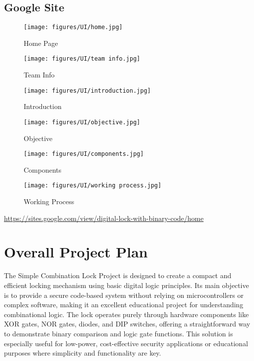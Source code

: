 \subsection{Google Site}
\begin{figure}[H]
    \centering
    \texttt{[image: figures/UI/home.jpg]} %
    \caption{Home Page}
    \label{fig:sample}
\end{figure}
\begin{figure}[H]
    \centering
    \texttt{[image: figures/UI/team info.jpg]} %
    \caption{Team Info}
    \label{fig:sample}
\end{figure}
\begin{figure}[H]
    \centering
    \texttt{[image: figures/UI/introduction.jpg]} %
    \caption{Introduction}
    \label{fig:sample}
\end{figure}
\begin{figure}[H]
    \centering
    \texttt{[image: figures/UI/objective.jpg]} %
    \caption{Objective}
    \label{fig:sample}
\end{figure}
\begin{figure}[H]
    \centering
    \texttt{[image: figures/UI/components.jpg]} %
    \caption{Components}
    \label{fig:sample}
\end{figure}
\begin{figure}[H]
    \centering
    \texttt{[image: figures/UI/working process.jpg]} %
    \caption{Working Process}
    \label{fig:sample}
\end{figure}
\url{https://sites.google.com/view/digital-lock-with-binary-code/home}


\section{Overall Project Plan}
The Simple Combination Lock Project is designed to create a compact and efficient locking mechanism using basic digital logic principles. Its main objective is to provide a secure code-based system without relying on microcontrollers or complex software, making it an excellent educational project for understanding combinational logic. The lock operates purely through hardware components like XOR gates, NOR gates, diodes, and DIP switches, offering a straightforward way to demonstrate binary comparison and logic gate functions. This solution is especially useful for low-power, cost-effective security applications or educational purposes where simplicity and functionality are key.\\


